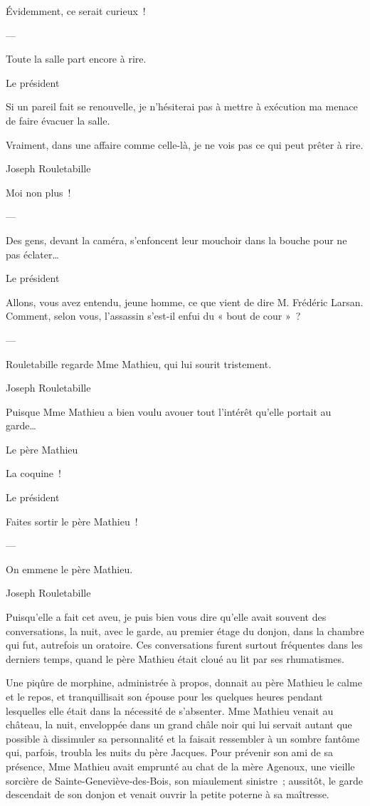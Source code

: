 \documentclass{frscenario}
\begin{document}
Évidemment, ce serait curieux !

\——

Toute la salle part encore à rire.

\— Le président

Si un pareil fait se renouvelle, je n’hésiterai pas à mettre à exécution ma menace de faire évacuer la salle.

Vraiment, dans une affaire comme celle-là, je ne vois pas ce qui peut prêter à rire.

\— Joseph Rouletabille

Moi non plus !

\——

Des gens, devant la caméra, s’enfoncent leur mouchoir dans la bouche pour ne pas éclater…

\— Le président

Allons, vous avez entendu, jeune homme, ce que vient de dire M. Frédéric Larsan. Comment, selon vous, l’assassin s’est-il enfui du « bout de cour » ?

\——

Rouletabille regarde Mme Mathieu, qui lui sourit tristement.

\— Joseph Rouletabille

Puisque Mme Mathieu a bien voulu avouer tout l’intérêt qu’elle portait au garde…

\— Le père Mathieu

La coquine !

\— Le président

Faites sortir le père Mathieu !

\——

On emmene le père Mathieu.

\— Joseph Rouletabille

Puisqu’elle a fait cet aveu, je puis bien vous dire qu’elle avait souvent des conversations, la nuit, avec le garde, au premier étage du donjon, dans la chambre qui fut, autrefois un oratoire. Ces conversations furent surtout fréquentes dans les derniers temps, quand le père Mathieu était cloué au lit par ses rhumatismes.

Une piqûre de morphine, administrée à propos, donnait au père Mathieu le calme et le repos, et tranquillisait son épouse pour les quelques heures pendant lesquelles elle était dans la nécessité de s’absenter. Mme Mathieu venait au château, la nuit, enveloppée dans un grand châle noir qui lui servait autant que possible à dissimuler sa personnalité et la faisait ressembler à un sombre fantôme qui, parfois, troubla les nuits du père Jacques. Pour prévenir son ami de sa présence, Mme Mathieu avait emprunté au chat de la mère Agenoux, une vieille sorcière de Sainte-Geneviève-des-Bois, son miaulement sinistre ; aussitôt, le garde descendait de son donjon et venait ouvrir la petite poterne à sa maîtresse.
\end{document}
